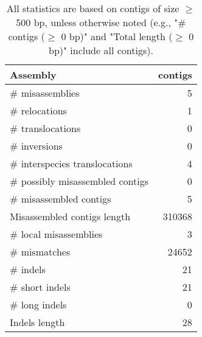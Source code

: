 \documentclass[12pt,a4paper]{article}
\begin{document}
\begin{table}[ht]
\begin{center}
\caption{All statistics are based on contigs of size $\geq$ 500 bp, unless otherwise noted (e.g., "\# contigs ($\geq$ 0 bp)" and "Total length ($\geq$ 0 bp)" include all contigs).}
\begin{tabular}{|l*{1}{|r}|}
\hline
Assembly & contigs \\ \hline
\# misassemblies & 5 \\ \hline
\hspace{5mm}\# relocations & 1 \\ \hline
\hspace{5mm}\# translocations & 0 \\ \hline
\hspace{5mm}\# inversions & 0 \\ \hline
\hspace{5mm}\# interspecies translocations & 4 \\ \hline
\# possibly misassembled contigs & 0 \\ \hline
\# misassembled contigs & 5 \\ \hline
Misassembled contigs length & 310368 \\ \hline
\# local misassemblies & 3 \\ \hline
\# mismatches & 24652 \\ \hline
\# indels & 21 \\ \hline
\hspace{5mm}\# short indels & 21 \\ \hline
\hspace{5mm}\# long indels & 0 \\ \hline
Indels length & 28 \\ \hline
\end{tabular}
\end{center}
\end{table}
\end{document}
